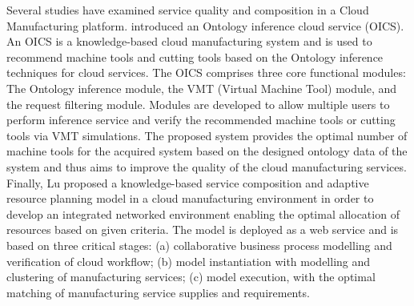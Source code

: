 Several studies have examined service quality and composition in a Cloud Manufacturing platform. \textcite{lin_oics_2015} introduced an Ontology inference cloud service (OICS). An OICS is a knowledge-based cloud manufacturing system and is used to recommend machine tools and cutting tools based on the Ontology inference techniques for cloud services. The OICS comprises three core functional modules: The Ontology inference module, the VMT (Virtual Machine Tool) module, and the request filtering module. Modules are developed to allow multiple users to perform inference service and verify the recommended machine tools or cutting tools via VMT simulations. The proposed system provides the optimal number of machine tools for the acquired system based on the designed ontology data of the system and thus aims to improve the quality of the cloud manufacturing services.\\
Finally, Lu proposed a knowledge-based service composition and adaptive resource planning model in a cloud manufacturing environment in order to develop an integrated networked environment enabling the optimal allocation of resources based on given criteria. The model is deployed as a web service and is based on three critical stages: (a) collaborative business process modelling and verification of cloud workflow; (b) model instantiation with modelling and clustering of manufacturing services; (c) model execution, with the optimal matching of manufacturing service supplies and requirements.

